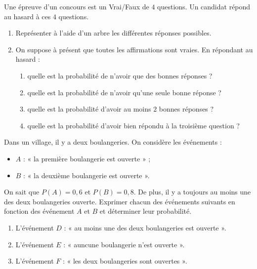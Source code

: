 \documentclass[11pt]{article}
\begin{document}
\begin{exo}
  Une épreuve d'un concours est un Vrai/Faux de $4$ questions. Un candidat
  répond au hasard à ces $4$ questions.
  \begin{enumerate}
    \item Représenter à l'aide d'un arbre les différentes réponses possibles.
    \item On suppose à présent que toutes les affirmations sont vraies. En
      répondant au hasard :
      \begin{enumerate}
        \item quelle est la probabilité de n'avoir que des bonnes réponses ?
        \item quelle est la probabilité de n'avoir qu'une seule bonne réponse ?
        \item quelle est la probabilité d'avoir au moins $2$ bonnes réponses ?
        \item quelle est la probabilité d'avoir bien répondu à la troisième
          question ?
      \end{enumerate}
  \end{enumerate}
\end{exo}

\begin{exo}
  Dans un village, il y a deux boulangeries. On considère les événements :
  \begin{itemize}
    \item $A$ : « la première boulangerie est ouverte » ;
    \item $B$ : « la deuxième boulangerie est ouverte ».
  \end{itemize}
  On sait que $P(A) = 0,6$ et $P(B)=0,8$. De plus, il y a toujours au moins une
  des deux boulangeries ouverte. Exprimer chacun des événements suivants en
  fonction des événement $A$ et $B$ et déterminer leur probabilité.
  \begin{enumerate}
    \item L'événement $D$ : « au moins une des deux boulangeries est ouverte ».
    \item L'événement $E$ : « auncune boulangerie n'est ouverte ».
    \item L'événement $F$ : « les deux boulangeries sont ouvertes ».
  \end{enumerate}
\end{exo}
\end{document}
